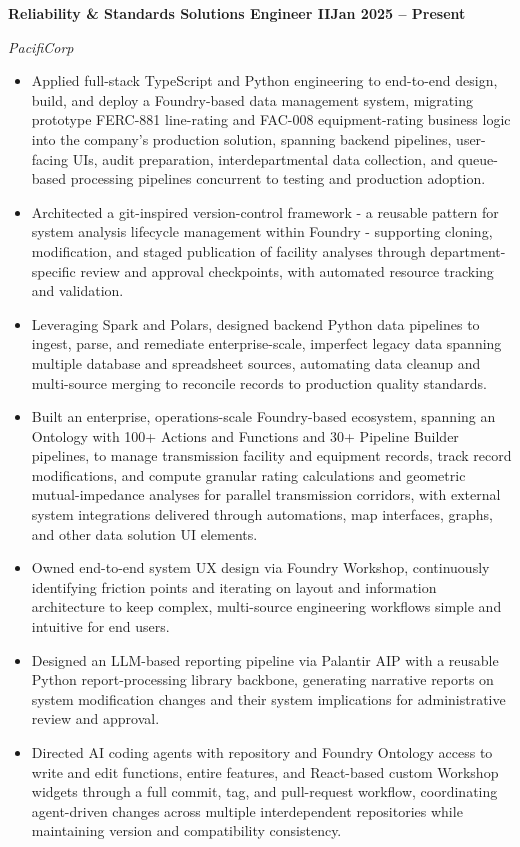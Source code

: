 \documentclass[10pt, letterpaper]{article}
\newcommand{\jobline}[2]{%
  \vspace{5pt}%
  \noindent\textbf{#1}\hfill\textbf{#2}\par%
  \vspace{1pt}%
}
\newcommand{\subline}[1]{%
  \vspace{-1pt}%
  \noindent\textit{#1}\par%
  \vspace{1pt}%
}
\newenvironment{rlist}{%
  \begin{itemize}[leftmargin=1.4em, itemsep=1pt, topsep=2pt, parsep=0pt]%
}{%
  \end{itemize}%
}
\begin{document}
\jobline{Reliability \& Standards Solutions Engineer II}{Jan 2025 -- Present}
\subline{PacifiCorp}
\begin{rlist}
  \item Applied full-stack TypeScript and Python engineering to end-to-end design, build, and deploy a Foundry-based data management system, migrating prototype FERC-881 line-rating and FAC-008 equipment-rating business logic into the company's production solution, spanning backend pipelines, user-facing UIs, audit preparation, interdepartmental data collection, and queue-based processing pipelines concurrent to testing and production adoption.
  \item Architected a git-inspired version-control framework - a reusable pattern for system analysis lifecycle management within Foundry - supporting cloning, modification, and staged publication of facility analyses through department-specific review and approval checkpoints, with automated resource tracking and validation.
  \item Leveraging Spark and Polars, designed backend Python data pipelines to ingest, parse, and remediate enterprise-scale, imperfect legacy data spanning multiple database and spreadsheet sources, automating data cleanup and multi-source merging to reconcile records to production quality standards.
  \item Built an enterprise, operations-scale Foundry-based ecosystem, spanning an Ontology with 100+ Actions and Functions and 30+ Pipeline Builder pipelines, to manage transmission facility and equipment records, track record modifications, and compute granular rating calculations and geometric mutual-impedance analyses for parallel transmission corridors, with external system integrations delivered through automations, map interfaces, graphs, and other data solution UI elements.
  \item Owned end-to-end system UX design via Foundry Workshop, continuously identifying friction points and iterating on layout and information architecture to keep complex, multi-source engineering workflows simple and intuitive for end users.
  \item Designed an LLM-based reporting pipeline via Palantir AIP with a reusable Python report-processing library backbone, generating narrative reports on system modification changes and their system implications for administrative review and approval.
  \item Directed AI coding agents with repository and Foundry Ontology access to write and edit functions, entire features, and React-based custom Workshop widgets through a full commit, tag, and pull-request workflow, coordinating agent-driven changes across multiple interdependent repositories while maintaining version and compatibility consistency.

\end{rlist}
\end{document}
